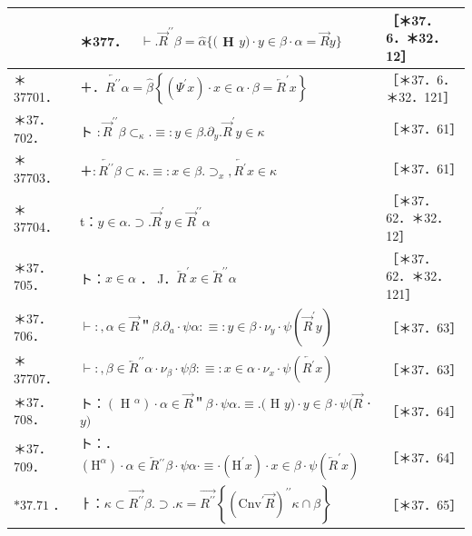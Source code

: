 \documentclass[10pt]{article}
\begin{document}
\begin{center}
\begin{tabular}{|l|l|l|}
\hline
 & ＊377．$\quad \vdash . \vec{R}^{\prime \prime} \beta=\hat{\alpha}\{($ H $y) \cdot y \in \beta \cdot \alpha=\vec{R} y\}$ & ［＊37．6．＊32．12］ \\
\hline
＊37701． & ＋．$\overleftarrow{R^{\prime \prime}} \alpha=\hat{\beta}\left\{\left(\Psi^{\prime} x\right) \cdot x \in \alpha \cdot \beta=\overleftarrow{R}^{\prime} x\right\}$ & ［＊37．6．＊32．121］ \\
\hline
＊37．702． & ト $: \vec{R}^{\prime \prime} \beta \subset_{\kappa} . \equiv: y \in \beta . \partial_{y} . \vec{R}^{\prime} y \in \kappa$ & ［＊37．61］ \\
\hline
＊37703． & ＋$: \overleftarrow{R^{\prime \prime}} \beta \subset \kappa . \equiv: x \in \beta . \supset_{x}, \overleftarrow{R^{\prime}} x \in \kappa$ & ［＊37．61］ \\
\hline
＊37704． & t：$y \in \alpha . \supset . \vec{R}^{\prime} y \in \vec{R}^{\prime \prime} \alpha$ & ［＊37．62．＊32．12］ \\
\hline
＊37．705． & ト：$x \in \alpha$ ． J．$\overleftarrow{R}^{\prime} x \in \overleftarrow{R}^{\prime \prime} \alpha$ & ［＊37．62．＊32．121］ \\
\hline
＊37．706． & $\vdash:, \alpha \in \vec{R}$＂$\beta . \partial_{a} \cdot \psi \alpha: \equiv: y \in \beta \cdot \nu_{y} \cdot \psi\left(\vec{R}^{\prime} y\right)$ & ［＊37．63］ \\
\hline
＊37707． & $\vdash:, \beta \in \overleftarrow{R}^{\prime \prime} \alpha \cdot \nu_{\beta} \cdot \psi \beta: \equiv: x \in \alpha \cdot \nu_{x} \cdot \psi\left(\overleftarrow{R^{\prime}} x\right)$ & ［＊37．63］ \\
\hline
＊37．708． & ト：$\left(\right.$ H $\left.^{\alpha}\right) \cdot \alpha \in \vec{R}$＂$\beta \cdot \psi \alpha . \equiv .($ H $y) \cdot y \in \beta \cdot \psi(\vec{R}$ ⋅ $y)$ & ［＊37．64］ \\
\hline
＊37．709． & ト：．$\left(\mathrm{H}^{\alpha}\right) \cdot \alpha \in \overleftarrow{R}{ }^{\prime \prime} \beta \cdot \psi \alpha \cdot \equiv \cdot\left(\mathrm{H}^{\prime} x\right) \cdot x \in \beta \cdot \psi\left(\overleftarrow{R}^{\prime} x\right)$ & ［＊37．64］ \\
\hline
$* 37.71$ ． & ㅏ：$\kappa \subset \overrightarrow{R^{\prime \prime}} \beta . \supset . \kappa=\overrightarrow{R^{\prime \prime}}\left\{\left(\mathrm{Cnv}^{\prime} \vec{R}\right)^{\prime \prime} \kappa \cap \beta\right\}$ & ［＊37．65］ \\

\end{tabular}
\end{center}
\end{document}
